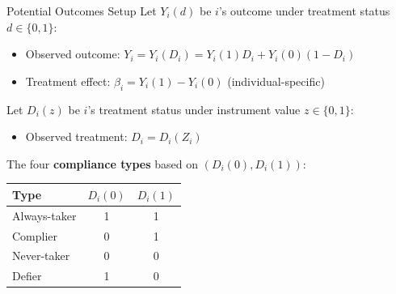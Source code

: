 \documentclass{beamer}
\begin{document}
\begin{frame}{Potential Outcomes Setup}
Let $Y_i(d)$ be $i$'s outcome under treatment status $d\in\{0,1\}$:
\begin{itemize}
  \item Observed outcome: $Y_i = Y_i(D_i) = Y_i(1)D_i + Y_i(0)(1-D_i)$
  \item Treatment effect: $\beta_i = Y_i(1)-Y_i(0)$ (individual-specific)
\end{itemize}

\medskip
Let $D_i(z)$ be $i$'s treatment status under instrument value $z\in\{0,1\}$:
\begin{itemize}
  \item Observed treatment: $D_i = D_i(Z_i)$
\end{itemize}

\medskip
The four \textbf{compliance types} based on $(D_i(0),D_i(1))$:
\begin{center}
\small
\begin{tabular}{lcc}
\toprule
Type & $D_i(0)$ & $D_i(1)$ \\
\midrule
Always-taker  & 1 & 1 \\
Complier      & 0 & 1 \\
Never-taker   & 0 & 0 \\
Defier        & 1 & 0 \\
\bottomrule
\end{tabular}
\end{center}
\end{frame}
\end{document}
